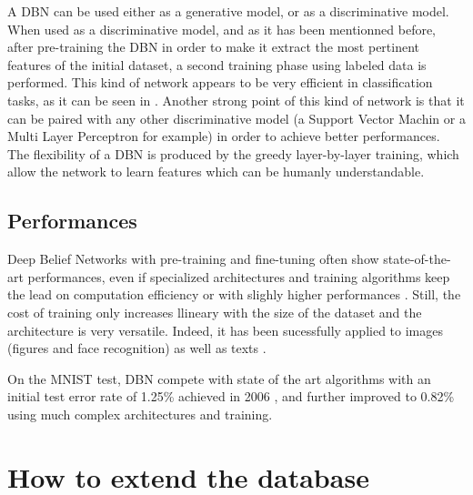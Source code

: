 \documentclass{report}
\begin{document}
	A DBN can be used either as a generative model, or as a discriminative model. 
	When used as a discriminative model, and as it has been mentionned before, 
	after pre-training the DBN in order to make it extract the most pertinent 
	features of the initial dataset, a second training phase using labeled data is 
	performed. This kind of network appears to be very efficient in classification 
	tasks, as it can be seen in \cite{hinton2006fast}. Another strong 
	point of this kind of network is that it can be paired with any other 
	discriminative model (a Support Vector Machin or a Multi Layer Perceptron for 
	example) in order to achieve better performances. The flexibility of a DBN is 
	produced by the greedy layer-by-layer training, which allow the network to 
	learn features which can be humanly understandable.
	
	\subsection{Performances}
	
	Deep Belief Networks with pre-training and fine-tuning often show 
	state-of-the-art performances, even if specialized architectures and training 
	algorithms keep the lead on computation efficiency or with slighly higher 
	performances \cite{ranzato2008semi}. Still, the cost of training only increases 
	llineary with the size of the dataset and the architecture is very versatile. 
	Indeed, it has been sucessfully applied to images (figures and face 
	recognition) as well as texts \cite{hinton2006reducing}.
	
	On the MNIST test, DBN compete with state of the art algorithms with an initial 
	test error rate of 1.25\% achieved in 2006 
	\cite{hinton2006fast}, and further improved to 0.82\% 
	\cite{lee2009convolutional} using  much complex architectures and training.
	
	\section{How to extend the database}
	
\end{document}
